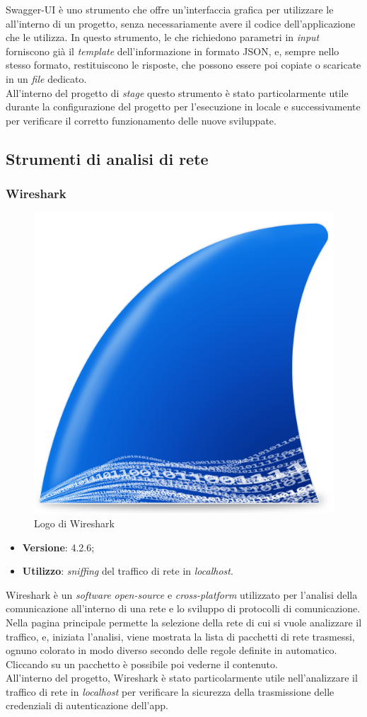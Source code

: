 \noindent Swagger-UI è uno strumento che offre un'interfaccia grafica per utilizzare le  all'interno di un progetto, senza necessariamente avere il codice dell'applicazione che le utilizza. In questo strumento, le  che richiedono parametri in \textit{input} forniscono già il \textit{template} dell'informazione in formato JSON, e, sempre nello stesso formato, restituiscono le risposte, che possono essere poi copiate o scaricate in un \textit{file} dedicato.\\
All'interno del progetto di \textit{stage} questo strumento è stato particolarmente utile durante la configurazione del progetto per l'esecuzione in locale e successivamente per verificare il corretto funzionamento delle nuove  sviluppate.


\subsection{Strumenti di analisi di rete}

\subsubsection{Wireshark}

\begin{figure}[H]
    \centering 
    \includegraphics[width=0.16\columnwidth]{images/loghi/wireshark.png} 
    \caption{Logo di Wireshark}
\end{figure}

\begin{itemize}
    \item \textbf{Versione}: 4.2.6;
    \item \textbf{Utilizzo}: \textit{sniffing} del traffico di rete in \textit{localhost}.
\end{itemize}

\noindent Wireshark è un \textit{software} \textit{open-source} e \textit{cross-platform} utilizzato per l'analisi della comunicazione all'interno di una rete e lo sviluppo di protocolli di comunicazione. Nella pagina principale permette la selezione della rete di cui si vuole analizzare il traffico, e, iniziata l'analisi, viene mostrata la lista di pacchetti di rete trasmessi, ognuno colorato in modo diverso secondo delle regole definite in automatico. Cliccando su un pacchetto è possibile poi vederne il contenuto.\\
All'interno del progetto, Wireshark è stato particolarmente utile nell'analizzare il traffico di rete in \textit{localhost} per verificare la sicurezza della trasmissione delle credenziali di autenticazione dell'app.


